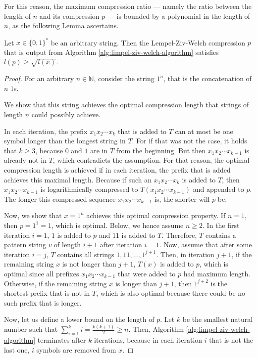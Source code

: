 For this reason, the maximum compression ratio --- namely the ratio between the length of $n$ and its compression $p$ --- is bounded by a polynomial in the length of $n$, as the following Lemma ascertains.
\begin{lemma}
	\label{lemma:lzw-bounded-compression-ratio}
	Let $x\in\{0,1\}^{*}$ be an arbitrary string.
	Then the Lempel-Ziv-Welch compression $p$ that is output from Algorithm \ref{alg:limpel-ziv-welch-algorithm} satisfies $l(p)\geq\sqrt{l(x)}$.
\end{lemma}
\begin{proof}
	For an arbitrary $n\in\mathbb{N}$, consider the string $1^n$, that is the concatenation of $n$ $1$s.
	
	We show that this string achieves the optimal compression length that strings of length $n$ could possibly achieve.
	
	In each iteration, the prefix $x_1x_2\cdots x_{k}$ that is added to $T$ can at most be one symbol longer than the longest string in $T$.
	For if that was not the case, it holds that $k\geq 3$, because $0$ and $1$ are in $T$ from the beginning.
	But then $x_1x_2\cdots x_{k-1}$ is already not in $T$, which contradicts the assumption.
	For that reason, the optimal compression length is achieved if in each iteration, the prefix that is added achieves this maximal length.
	Because if such an $x_1x_2\cdots x_{k}$ is added to $T$, then $x_1x_2\cdots x_{k-1}$ is logarithmically compressed to $T(x_1x_2\cdots x_{k-1})$ and appended to $p$. 
	The longer this compressed sequence $x_1x_2\cdots x_{k-1}$ is, the shorter will $p$ be.
	
	Now, we show that $x=1^n$ achieves this optimal compression property.
	If $n=1$, then $p=1^1=1$, which is optimal.
	Below, we hence assume $n\geq 2$.
	In the first iteration $i=1$, $1$ is added to $p$ and $11$ is added to $T$.
	Therefore, $T$ contains a pattern string $v$ of length $i+1$ after iteration $i=1$.
	Now, assume that after some iteration $i=j$, $T$ contains all strings $1,11,\dots,1^{j+1}$.
	Then, in iteration $j+1$, if the remaining string $x$ is not longer than $j+1$, $T(x)$ is added to $p$, which is optimal since all prefixes $x_1x_2\cdots x_{k-1}$ that were added to $p$ had maximum length.
	Otherwise, if the remaining string $x$ is longer than $j+1$, then $1^{j+2}$ is the shortest prefix that is not in $T$, which is also optimal because there could be no such prefix that is longer.
	
	Now, let us define a lower bound on the length of $p$.
	Let $k$ be the smallest natural number such that $\sum_{i=1}^{k}i=\frac{k(k+1)}{2}\geq n$.
	Then, Algorithm \ref{alg:limpel-ziv-welch-algorithm} terminates after $k$ iterations, because in each iteration $i$ that is not the last one, $i$ symbols are removed from $x$.
	

\end{proof}
